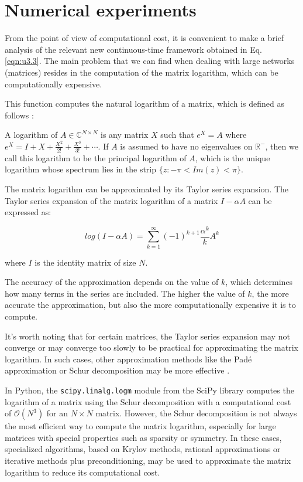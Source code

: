 \chapter{Numerical experiments}
\label{chap:expe}

From the point of view of computational cost, it is convenient to make a brief analysis of the relevant new continuous-time framework obtained in Eq. \ref{eqn:u3.3}. The main problem that we can find when dealing with large networks (matrices) resides in the computation of the matrix logarithm, which can be computationally expensive.

This function computes the natural logarithm of a matrix, which is defined as follows \cite{higham2008functions}:

\begin{definition}
    A logarithm of $A \in \mathbb{C}^{N\times N}$ is any matrix $X$ such that $e^X = A$ where $e^X = I + X + \frac{X^2}{2!} + \frac{X^3}{3!} + \cdots$. If $A$ is assumed to have no eigenvalues on $\mathbb{R}^{-}$, then we call this logarithm to be the principal logarithm of $A$, which is the unique logarithm whose spectrum lies in the strip $\{ z : −\pi < Im(z) < \pi \}$.
\end{definition}

The matrix logarithm can be approximated by its Taylor series expansion. The Taylor series expansion of the matrix logarithm of a matrix $I - \alpha A$ can be expressed as:

$$log(I - \alpha A) = \sum_{k=1}^{\infty} (-1)^{k+1}\frac{\alpha^k}{k}A^k$$

where $I$ is the identity matrix of size $N$.

The accuracy of the approximation depends on the value of $k$, which determines how many terms in the series are included. The higher the value of $k$, the more accurate the approximation, but also the more computationally expensive it is to compute.

It's worth noting that for certain matrices, the Taylor series expansion may not converge or may converge too slowly to be practical for approximating the matrix logarithm. In such cases, other approximation methods like the Padé approximation or Schur decomposition may be more effective \cite{higham2008functions}.

In Python, the \texttt{scipy.linalg.logm} module from the SciPy library computes the logarithm of a matrix using the Schur decomposition with a computational cost of $\mathcal{O}(N^3)$ for an $N \times N$ matrix. However, the Schur decomposition is not always the most efficient way to compute the matrix logarithm, especially for large matrices with special properties such as sparsity or symmetry. In these cases, specialized algorithms, based on Krylov methods, rational approximations or iterative methods plus preconditioning, may be used to approximate the matrix logarithm to reduce its computational cost.

